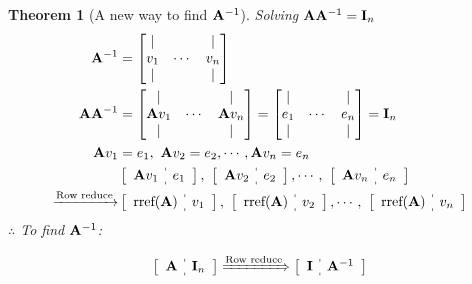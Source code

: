 \documentclass[12pt, a4paper]{article}
\newtheorem{thm}{Theorem}[subsection]
\def\matrixA{\vb{A}}
\def\matrixI{\vb{I}}
\begin{document}
\begin{thm}[A new way to find $\matrixA^{-1}$]
	Solving $\matrixA\matrixA^{-1}=\matrixI_n$
	$$\begin{aligned}
		\matrixA^{-1}&=\begin{bmatrix}|&&|\\v_1&\cdots& v_n\\|&&|\end{bmatrix}\\
		\matrixA\matrixA^{-1}&=\begin{bmatrix}|&&|\\\matrixA v_1&\cdots& \matrixA v_n\\|&&|\end{bmatrix}=\begin{bmatrix}|&&|\\e_1&\cdots& e_n\\|&&|\end{bmatrix}=\matrixI_n \\
		\matrixA v_1&=e_1,\ \matrixA v_2=e_2,\cdots,\matrixA v_n=e_n\\
		&\left[\begin{array}{c:c}\matrixA v_1&e_1\end{array}\right],\  \left[\begin{array}{c:c}\matrixA v_2&e_2\end{array}\right],\cdots,\ \left[\begin{array}{c:c}\matrixA v_n&e_n\end{array}\right]\\
		\xrightarrow[]{\text{Row reduce}}&\left[\begin{array}{c:c}\text{rref}(\matrixA) &v_1\end{array}\right],\  \left[\begin{array}{c:c}\text{rref}(\matrixA)  &v_2\end{array}\right],\cdots,\ \left[\begin{array}{c:c}\text{rref}(\matrixA)  &v_n\end{array}\right]
	\end{aligned}$$
	$\therefore$ To find $\matrixA^{-1}$:
	\begin{framed}\[\left[\begin{array}{c:c}\matrixA&\matrixI_n\end{array}\right]\xRightarrow{\text{Row reduce}}\left[\begin{array}{c:c}\matrixI&\matrixA^{-1}\end{array}\right]\]\end{framed}
\end{thm}
\end{document}
